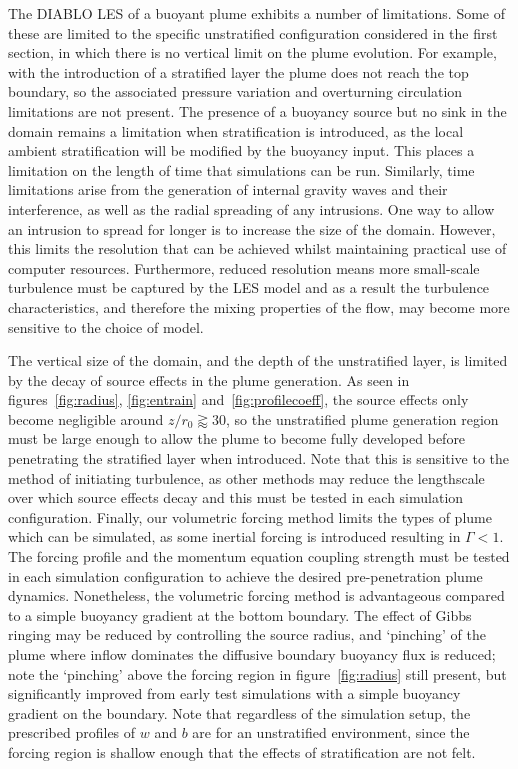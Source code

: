 \documentclass[a4paper]{article}
\begin{document}
The DIABLO LES of a buoyant plume exhibits a number of limitations. Some of these are limited to the specific
unstratified configuration considered in the first section, in which there is no vertical limit on the plume
evolution. For example, with the introduction of a stratified layer the plume does not reach the top boundary,
so the associated pressure variation and overturning circulation limitations are not present. The presence of
a buoyancy source but no sink in the domain remains a limitation when stratification is introduced, as the
local ambient stratification will be modified by the buoyancy input. This places a limitation on the length of
time that simulations can be run. Similarly, time limitations arise from the generation of internal gravity
waves and their interference, as well as the radial spreading of any intrusions. One way to allow an intrusion
to spread for longer is to increase the size of the domain. However, this limits the resolution that can be
achieved whilst maintaining practical use of computer resources.  Furthermore, reduced resolution means more
small-scale turbulence must be captured by the LES model and as a result the turbulence characteristics, and
therefore the mixing properties of the flow, may become more sensitive to the choice of model. 

The vertical size of the domain, and the depth of the unstratified layer, is limited by the decay of source
effects in the plume generation. As seen in figures~\ref{fig:radius}, \ref{fig:entrain}
and~\ref{fig:profilecoeff}, the source effects only become negligible around $z/r_0 \gtrapprox 30$, so the
unstratified plume generation region must be large enough to allow the plume to become fully developed before
penetrating the stratified layer when introduced. Note that this is sensitive to the method of initiating
turbulence, as other methods may reduce the lengthscale over which source effects decay and this must be
tested in each simulation configuration. Finally, our volumetric forcing method limits the types of plume
which can be simulated, as some inertial forcing is introduced resulting in $\Gamma < 1$. The forcing profile
and the momentum equation coupling strength must be tested in each simulation configuration to achieve the
desired pre-penetration plume dynamics. Nonetheless, the volumetric forcing method is advantageous compared to
a simple buoyancy gradient at the bottom boundary. The effect of Gibbs ringing may be reduced by controlling
the source radius, and `pinching' of the plume where inflow dominates the diffusive boundary buoyancy flux is
reduced; note the `pinching' above the forcing region in figure~\ref{fig:radius} still present, but
significantly improved from early test simulations with a simple buoyancy gradient on the boundary. Note that
regardless of the simulation setup, the prescribed profiles of $w$ and $b$ are for an unstratified
environment, since the forcing region is shallow enough that the effects of stratification are not felt.


\begin{multicols}{2}
{\small}
\end{multicols}
\end{document}
